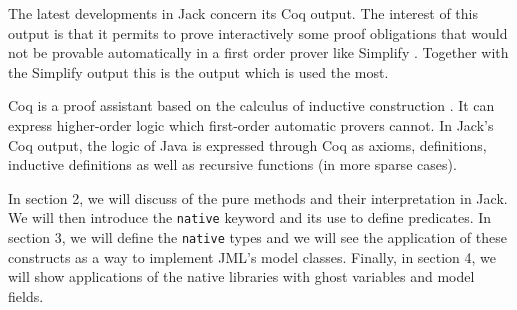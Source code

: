 The latest developments in Jack concern its Coq output. 
The interest of this output is that it permits to prove interactively some proof 
obligations that would not be provable automatically in a first order 
prover like Simplify \cite{simplify}.
Together with the Simplify output this is the output which is used the most.

Coq is a proof assistant based on the calculus of inductive construction \cite{BC-04-COQ}. 
It can express 
higher-order logic which first-order automatic provers cannot. In Jack's Coq output, the logic of 
Java is  expressed through Coq as axioms, definitions, inductive definitions as well as recursive 
functions (in more sparse cases).

In section 2,  we will discuss of the pure methods and their interpretation in Jack. We will then introduce
the {\tt native} keyword and its use to define predicates.
In section 3, we will define the {\tt native} types and we will see the application of these constructs 
as a way to implement JML's model classes.
Finally, in section 4, we will show applications of the native libraries with 
 ghost variables and model fields.
